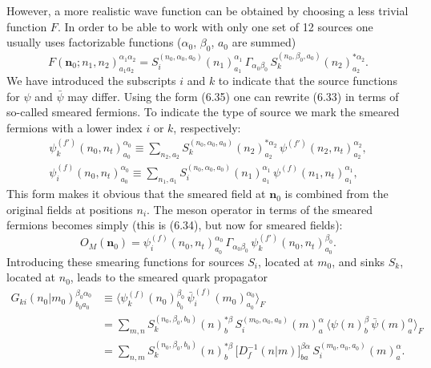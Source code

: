 However, a more realistic wave function can be obtained by choosing a less
trivial function $F$. In order to be able to work with only one set of 12
sources one usually uses factorizable functions ($\alpha_0$, $\beta_0$, $a_0$
are summed)
\begin{equation}
  F(\mathbf{n}_0; n_1, n_2)^{\alpha_1\alpha_2}_{a_1a_2}
  = S_i^{(n_0,\alpha_0,a_0)}(n_1)^{\alpha_1}_{a_1}\,
    \Gamma_{\alpha_0\beta_0}\,
    S_k^{(n_0,\beta_0,a_0)}(n_2)^{*\alpha_2}_{a_2} .
\end{equation}
We have introduced the subscripts $i$ and $k$ to indicate that the source
functions for $\psi$ and $\bar\psi$ may differ. Using the form (6.35) one can
rewrite (6.33) in terms of so-called smeared fermions. To indicate the type of
source we mark the smeared fermions with a lower index $i$ or $k$,
respectively:
\begin{equation}
  \begin{gathered}
    \psi_k^{(f')}(n_0, n_t)^{\alpha_0}_{a_0}
    \equiv \sum_{n_2,a_2} S_k^{(n_0,\alpha_0,a_0)}(n_2)^{*\alpha_2}_{a_2}\,
      \psi^{(f')}(n_2, n_t)^{\alpha_2}_{a_2} , \\
    \psi_i^{(f)}(n_0, n_t)^{\alpha_0}_{a_0}
    \equiv \sum_{n_1,a_1} S_i^{(n_0,\alpha_0,a_0)}(n_1)^{\alpha_1}_{a_1}\,
      \psi^{(f)}(n_1, n_t)^{\alpha_1}_{a_1} ,
  \end{gathered}
\end{equation}
This form makes it obvious that the smeared field at $\mathbf{n}_0$ is combined
from the original fields at positions $n_i$. The meson operator in terms of the
smeared fermions becomes simply (this is (6.34), but now for smeared fields):
\begin{equation}
  O_M(\mathbf{n}_0) = \psi_i^{(f)}(n_0, n_t)^{\alpha_0}_{a_0}\,
    \Gamma_{\alpha_0\beta_0}\,
    \psi_k^{(f')}(n_0, n_t)^{\beta_0}_{a_0} .
\end{equation}
Introducing these smearing functions for sources $S_i$, located at $m_0$, and
sinks $S_k$, located at $n_0$, leads to the smeared quark propagator
\begin{equation}
  \begin{split}
    G_{ki}(n_0|m_0)^{\beta_0\alpha_0}_{b_0a_0}
    &\equiv \big\langle \psi_k^{(f)}(n_0)^{\beta_0}_{b_0}\,
       \bar\psi_i^{(f)}(m_0)^{\alpha_0}_{a_0} \big\rangle_F \\
    &= \sum_{m,n} S_k^{(n_0,\beta_0,b_0)}(n)^{*\beta}_{b}\,
       S_i^{(m_0,\alpha_0,a_0)}(m)^{\alpha}_{a}\,
       \big\langle \psi(n)^{\beta}_{b}\, \bar\psi(m)^{\alpha}_{a} \big\rangle_F \\
    &= \sum_{n,m} S_k^{(n_0,\beta_0,b_0)}(n)^{*\beta}_{b}\,
       \big[D_f^{-1}(n|m)\big]^{\beta\alpha}_{ba}\,
       S_i^{(m_0,\alpha_0,a_0)}(m)^{\alpha}_{a} .
  \end{split}
\end{equation}
